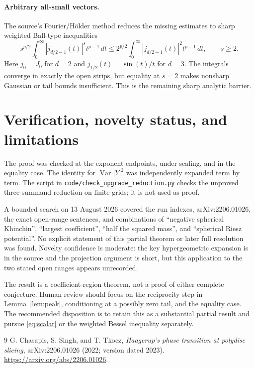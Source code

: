 \documentclass[11pt]{article}
\newcommand{\Var}{\operatorname{Var}}
\begin{document}
\paragraph{Arbitrary all-small vectors.}
The source's Fourier/H\"older method reduces the missing estimates to sharp
weighted Ball-type inequalities
\[
 s^{p/2}\int_0^\infty |j_{d/2-1}(t)|^s t^{p-1}\,dt
 \leq 2^{p/2}\int_0^\infty |j_{d/2-1}(t)|^2t^{p-1}\,dt,
 \qquad s\geq2.
\]
Here $j_0=J_0$ for $d=2$ and $j_{1/2}(t)=\sin(t)/t$ for $d=3$.  The
integrals converge in exactly the open strips, but equality at $s=2$ makes
nonsharp Gaussian or tail bounds insufficient.  This is the remaining sharp
analytic barrier.

\section{Verification, novelty status, and limitations}

The proof was checked at the exponent endpoints, under scaling, and in the
equality case.  The identity for $\Var|Y|^2$ was independently expanded term
by term.  The script in \texttt{code/check\_upgrade\_reduction.py} checks the
unproved three-summand reduction on finite grids; it is not used as proof.

A bounded search on 13 August 2026 covered the run indexes, arXiv:2206.01026,
the exact open-range sentences, and combinations of ``negative spherical
Khinchin'', ``largest coefficient'', ``half the squared mass'', and
``spherical Riesz potential''.  No explicit statement of this partial theorem
or later full resolution was found.  Novelty confidence is moderate: the key
hypergeometric expansion is in the source and the projection argument is
short, but this application to the two stated open ranges appears unrecorded.

The result is a coefficient-region theorem, not a proof of either complete
conjecture.  Human review should focus on the reciprocity step in
Lemma~\ref{lem:peak}, conditioning at a possibly zero tail, and the equality
case.  The recommended disposition is to retain this as a substantial partial
result and pursue \eqref{eq:scalar} or the weighted Bessel inequality
separately.

\begin{thebibliography}{9}
G. Chasapis, S. Singh, and T. Tkocz,
\emph{Haagerup's phase transition at polydisc slicing},
arXiv:2206.01026 (2022; version dated 2023).
\url{https://arxiv.org/abs/2206.01026}.
\end{thebibliography}
\end{document}
